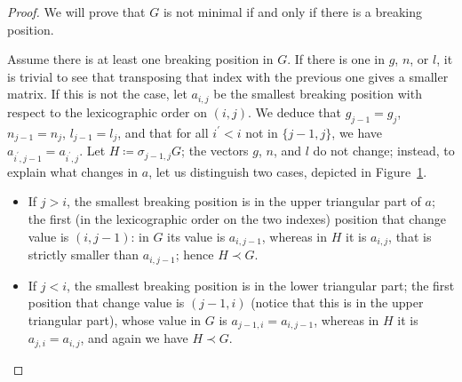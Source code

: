 \documentclass{amsart}
\theoremstyle{plain}
\theoremstyle{definition}
\begin{document}
\begin{proof}
  We will prove that $G$ is not minimal if and only if there is a
  breaking position.

  Assume there is at least one breaking position in $G$. If there is
  one in $g$, $n$, or $l$, it is trivial to see that transposing that
  index with the previous one gives a smaller matrix. If this is not
  the case, let $a_{i,j}$ be the smallest breaking position with
  respect to the lexicographic order on $(i,j)$. We deduce that
  $g_{j-1} = g_j$, $n_{j-1} = n_j$, $l_{j-1} = l_j$, and that for all
  $i^\prime < i$ not in $\{j-1,j\}$, we have $a_{i^\prime, j-1} =
  a_{i^\prime, j}$. Let $H \coloneqq \sigma_{j-1,j} G$; the vectors
  $g$, $n$, and $l$ do not change; instead, to explain what changes in
  $a$, let us distinguish two cases, depicted in Figure~\ref{fig:a}.
  \begin{itemize}
  \item If $j > i$, the smallest breaking position is in the upper
    triangular part of $a$; the first (in the lexicographic order on
    the two indexes) position that change value is $(i,j-1)$: in $G$
    its value is $a_{i,j-1}$, whereas in $H$ it is $a_{i,j}$, that is
    strictly smaller than $a_{i,j-1}$; hence $H \prec G$.
  \item If $j < i$, the smallest breaking position is in the lower
    triangular part; the first position that change value is $(j-1,i)$
    (notice that this is in the upper triangular part), whose value in
    $G$ is $a_{j-1,i} = a_{i,j-1}$, whereas in $H$ it is $a_{j,i} =
    a_{i,j}$, and again we have $H \prec G$.
  \end{itemize}

  \begin{figure}\label{fig:a}
\end{figure}
\end{proof}
\end{document}
